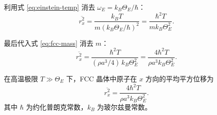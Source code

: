 \begin{derivationbox}[标准解题过程]
利用式 \eqref{eq:einstein-temp} 消去 $\omega_E=k_B\Theta_E/\hbar$：
\begin{equation}
\overline{r_x^2} = \frac{k_BT}{m(k_B\Theta_E/\hbar)^2} = \frac{\hbar^2 T}{mk_B\Theta_E^2}.
\end{equation}

最后代入式 \eqref{eq:fcc-mass} 消去 $m$：
\begin{equation}
\boxed{\overline{r_x^2} = \frac{\hbar^2 T}{(\rho a^3/4)\,k_B\Theta_E^2} = \frac{4\hbar^2 T}{\rho a^3 k_B\Theta_E^2}.}
\end{equation}
\end{derivationbox}

\begin{formulabox}[答案汇总]
在高温极限 $T\gg\Theta_E$ 下，FCC 晶体中原子在 $x$ 方向的平均平方位移为
\begin{equation}
\boxed{\overline{r_x^2} = \frac{4\hbar^2 T}{\rho a^3 k_B\Theta_E^2}.}
\end{equation}
其中 $\hbar$ 为约化普朗克常数，$k_B$ 为玻尔兹曼常数。
\end{formulabox}

